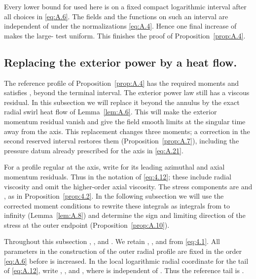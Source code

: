 Every lower bound for  used here is on a fixed compact logarithmic
interval after all choices in \eqref{eq:A.6}. The fields and the functions
 on such an interval are independent of
 under the normalizations \eqref{eq:A.4}. Hence one final increase
of  makes the large- test uniform.
This finishes the proof of Proposition~\ref{prop:A.4}.

\subsection{Replacing the exterior power by a heat flow.}\label{sec:A.6}
The reference profile  of Proposition~\ref{prop:A.4} has the
required moments and satisfies ,
 beyond the terminal interval. The
exterior power law  still has a viscous residual. In
this subsection we will replace it beyond the annulus by the exact radial swirl heat flow
 of Lemma~\ref{lem:A.6}. This will make the exterior momentum
residual vanish and give the field smooth limits at the singular time away from the axis. This
replacement changes three moments; a correction in the second reserved interval
 restores them (Proposition~\ref{prop:A.7}), including the pressure
datum  already prescribed for the axis in \eqref{eq:A.21}.

For a profile regular at the axis, write
 for its leading azimuthal
and axial momentum residuals. Thus  in
the notation of \eqref{eq:4.12}; these include radial viscosity and omit the higher-order axial
viscosity. The stress components are
 and
, as in
Proposition~\ref{prop:4.2}. In the following subsection we will use the corrected moment
conditions to rewrite these integrals as integrals from  to infinity
(Lemma~\ref{lem:A.8}) and determine the sign and limiting direction of the stress at the outer
endpoint (Proposition~\ref{prop:A.10}).

Throughout this subsection ,
, and . We retain
, , and
 from \eqref{eq:4.1}. All parameters in the construction
of the outer radial profile are fixed in the order \eqref{eq:A.6} before
 is increased. In the local logarithmic radial coordinate for the
tail of \eqref{eq:A.12}, write ,
, and
, where
 is independent of . Thus the
reference tail is .

